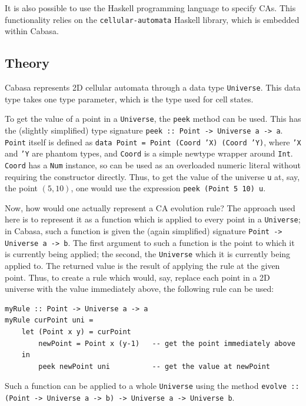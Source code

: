 \documentclass[oneside,a4paper]{memoir}
\begin{document}
\noindent It is also possible to use the Haskell programming language to specify CAs.
This functionality relies on the \texttt{cellular-automata} Haskell library, which is embedded within Cabasa.

\subsection{Theory}
\label{sec:hsth}

Cabasa represents 2D cellular automata through a data type \texttt{Universe}.
This data type takes one type parameter, which is the type used for cell states.

To get the value of a point in a \texttt{Universe}, the \texttt{peek} method can be used.
This has the (slightly simplified) type signature \texttt{peek :: Point -> Universe a -> a}.
\texttt{Point} itself is defined as \texttt{data Point = Point (Coord 'X) (Coord 'Y)},
  where \texttt{'X} and \texttt{'Y} are phantom types,
  and \texttt{Coord} is a simple newtype wrapper around \texttt{Int}.
\texttt{Coord} has a \texttt{Num} instance,
  so can be used as an overloaded numeric literal without requiring the constructor directly.
Thus, to get the value of the universe \texttt{u} at, say, the point $(5, 10)$,
  one would use the expression \texttt{peek (Point 5 10) u}.

Now, how would one actually represent a CA evolution rule?
The approach used here is to represent it as a function which is applied to every point in a \texttt{Universe};
  in Cabasa, such a function is given the (again simplified) signature \texttt{Point -> Universe~a -> b}.
The first argument to such a function is the point to which it is currently being applied;
  the second, the \texttt{Universe} which it is currently being applied to.
The returned value is the result of applying the rule at the given point.
Thus, to create a rule which would, say, replace each point in a 2D universe with the value immediately above,
  the following rule can be used:

\begin{verbatim}
myRule :: Point -> Universe a -> a
myRule curPoint uni =
    let (Point x y) = curPoint
        newPoint = Point x (y-1)   -- get the point immediately above
    in
        peek newPoint uni          -- get the value at newPoint
\end{verbatim}

Such a function can be applied to a whole \texttt{Universe} using the method
  \texttt{evolve~:: (Point -> Universe a -> b) -> Universe a -> Universe b}.
\end{document}
